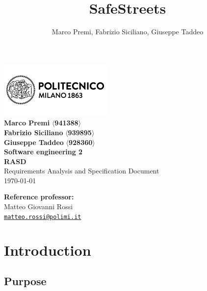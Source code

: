 \documentclass{article}
\title{SafeStreets}
\author{Marco Premi, Fabrizio Siciliano, Giuseppe Taddeo}
\begin{document}
\begin{center}
    \includegraphics[width=0.5\linewidth]{Images/logo_polimi.png}\\[4ex]
    \begingroup
        \huge \textbf{Marco Premi} $\langle$\textbf{941388}$\rangle$ \\
        \vfill
        \huge \textbf{Fabrizio Siciliano} $\langle$\textbf{939895}$\rangle$\\
        \vfill
        \huge \textbf{Giuseppe Taddeo} $\langle$\textbf{928360}$\rangle$\\
        \vfill
    \endgroup
    \vfill
    \begingroup
        \fontsize{15pt}{12pt}\selectfont
        \textbf{Software engineering 2}
    \endgroup\\[3ex]
    \begingroup
        \fontsize{20pt}{12pt}\selectfont \textbf{RASD}\\[1ex]
        \fontsize{15pt}{12pt}\selectfont Requirements Analysis and Specification
        Document \endgroup\\[8ex]
    \normalsize \today\\
\end{center}

\vspace*{\fill}
\begin{flushright}
    \textbf{Reference professor:}\\[0.2cm]
    Matteo Giovanni Rossi\\[0cm]
    {\small
    \href{mailto:matteo.rossi@polimi.it}{\texttt{matteo.rossi@polimi.it}}}
\end{flushright}

\newpage
\tableofcontents

\newpage
\section{Introduction}
\subsection{Purpose}
\end{document}
